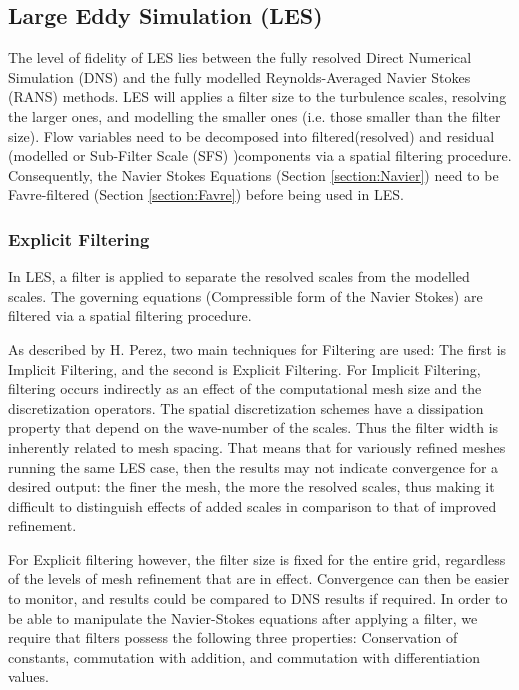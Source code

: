 \subsection{Large Eddy Simulation (LES)}
The level of fidelity of LES lies between the fully resolved Direct Numerical Simulation (DNS) and the fully modelled Reynolds-Averaged Navier Stokes (RANS) methods. LES will applies a filter size to the turbulence scales, resolving the larger ones, and modelling the smaller ones (i.e. those smaller than the filter size). Flow variables need to be decomposed into filtered(resolved) and residual (modelled or Sub-Filter Scale (SFS) )components via a spatial filtering procedure. Consequently, the Navier Stokes Equations (Section \ref{section:Navier}) need to be Favre-filtered (Section \ref{section:Favre}) before being used in LES.\par  

\subsubsection{Explicit Filtering} \label{section:Explicit Filtering}
In LES, a filter is applied to separate the resolved scales from the modelled scales. The governing equations (Compressible form of the Navier Stokes) are filtered via a spatial filtering procedure.\par

As described by H. Perez\cite{HPerez:2011}, two main techniques for Filtering are used: The first is Implicit Filtering, and the second is Explicit Filtering. For Implicit Filtering, filtering occurs indirectly as an effect of the computational mesh size and the discretization operators. The spatial discretization schemes have a dissipation property that depend on the wave-number of the scales. Thus the filter width is inherently related to mesh spacing. That means that for variously refined meshes running the same LES case, then the results may not indicate convergence for a desired output: the finer the mesh, the more the resolved scales, thus making it difficult to distinguish effects of added scales in comparison to that of improved refinement.\par

For Explicit filtering however, the filter size is fixed for the entire grid, regardless of the levels of mesh refinement that are in effect. Convergence can then be easier to monitor, and results could be compared to DNS results if required. In order to be able to manipulate the Navier-Stokes equations after applying a filter, we require that filters possess the following three properties: Conservation of constants, commutation with addition, and commutation with differentiation values.\par


